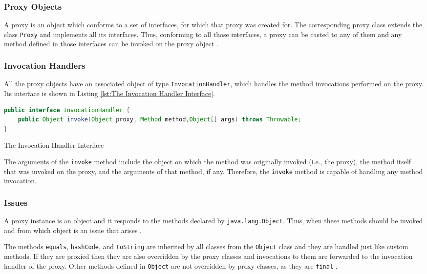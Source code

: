 \subsubsection{Proxy Objects}\label{Proxy Objects}
A proxy is an object which conforms to a set of interfaces, for which that proxy was created for. 
The corresponding proxy class extends the class \texttt{Proxy} and implements all its interfaces.
Thus, conforming to all those interfaces, a proxy can be casted to any of them and any method defined in those interfaces can be invoked on the proxy object \cite{eugster2006uniform}.

\subsubsection{Invocation Handlers}\label{Invocation Handlers}
All the proxy objects have an associated object of type \texttt{InvocationHandler}, which handles the method invocations performed on the proxy. 
Its interface is shown in Listing \ref{lst:The Invocation Handler Interface}.

\begin{sourcecode}
	\begin{lstlisting}[language=Java]
public interface InvocationHandler {
	public Object invoke(Object proxy, Method method,Object[] args) throws Throwable;
}		
	\end{lstlisting}
	\caption{The Invocation Handler Interface}
	\label{lst:The Invocation Handler Interface}
\end{sourcecode}

The arguments of the \texttt{invoke} method include the object on which the method was originally invoked (i.e., the proxy), the method itself that was invoked on the proxy, and the arguments of that method, if any.
Therefore, the \texttt{invoke} method is capable of handling any method invocation.

\subsubsection{Issues}\label{Dynamic Proxies Issues}
A proxy instance is an object and it responds to the methods declared by \texttt{java.lang.Object}. 
Thus, when these methods should be invoked and from which object is an issue that arises \cite{forman2004java}.

The methods \texttt{equals}, \texttt{hashCode}, and \texttt{toString} are inherited by all classes from the \texttt{Object} class and they are handled just like custom methods.
If they are proxied then they are also overridden by the proxy classes and invocations to them are forwarded to the invocation handler of the proxy. 
Other methods defined in \texttt{Object} are not overridden by proxy classes, as they are \texttt{final} \cite{eugster2006uniform}.

